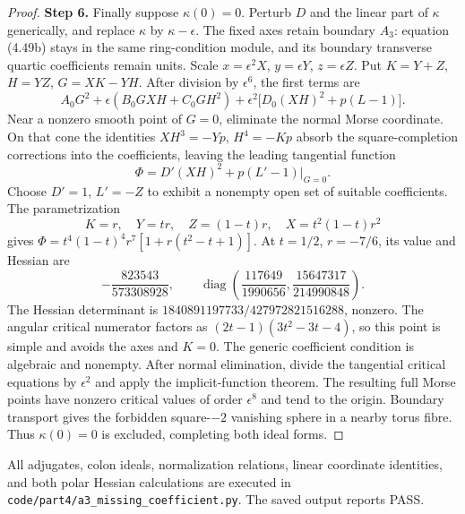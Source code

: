 \begin{proof}
\noindent\textbf{Step 6.} Finally suppose $\kappa(0)=0$. Perturb $D$ and the
linear part of $\kappa$ generically, and replace
$\kappa$ by $\kappa-\epsilon$. The fixed axes retain
boundary $A_3$: equation (4.49b) stays in the same
ring-condition module, and its boundary transverse
quartic coefficients remain units.
Scale $x=\epsilon^2X$, $y=\epsilon Y$, $z=\epsilon Z$.
Put $K=Y+Z$, $H=YZ$, $G=XK-YH$.
After division by $\epsilon^6$, the first terms are
\[
 A_0G^2+\epsilon(B_0GXH+C_0GH^2)
   +\epsilon^2\bigl[D_0(XH)^2+p(L-1)\bigr].
\]
Near a nonzero smooth point of $G=0$, eliminate the
normal Morse coordinate. On that cone the identities
$XH^3=-Yp$, $H^4=-Kp$ absorb the square-completion
corrections into the coefficients, leaving the leading
tangential function
\[
                    \Phi=D'(XH)^2+p(L'-1)|_{G=0}.
\]
Choose $D'=1$, $L'=-Z$ to exhibit a nonempty open
set of suitable coefficients. The parametrization
\[
 K=r,\quad Y=tr,\quad Z=(1-t)r,\quad
 X=t^2(1-t)r^2
\]
gives $\Phi=t^4(1-t)^4r^7[1+r(t^2-t+1)]$.
At $t=1/2$, $r=-7/6$, its value and Hessian are
\[
 -\frac{823543}{573308928},\qquad
 \operatorname{diag}\left(\frac{117649}{1990656},
                          \frac{15647317}{214990848}\right).
\]
The Hessian determinant is
$1840891197733/427972821516288$, nonzero.
The angular critical numerator factors as
$(2t-1)(3t^2-3t-4)$, so this point is simple and
avoids the axes and $K=0$. The generic coefficient
condition is algebraic and nonempty. After normal
elimination, divide the tangential critical equations
by $\epsilon^2$ and apply the implicit-function theorem.
The resulting full Morse points have nonzero critical
values of order $\epsilon^8$ and tend to the origin.
Boundary transport gives the forbidden square-$-2$
vanishing sphere in a nearby torus fibre. Thus
$\kappa(0)=0$ is excluded, completing both ideal forms.
\end{proof}

All adjugates, colon ideals, normalization relations,
linear coordinate identities, and both polar Hessian
calculations are executed in
\texttt{code/part4/a3\_missing\_coefficient.py}.
The saved output reports PASS.

